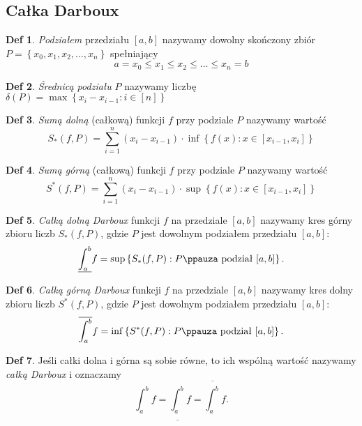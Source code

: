 \documentclass[a4paper, 12pt]{mwart}
\theoremstyle{definition}
\newtheorem{definicja}{Def}[section]
\theoremstyle{plain}
\theoremstyle{remark}
\newcommand{\upint}[2]{
	\overline{\int_{#1}^{#2}}
}
\newcommand{\loint}[2]{
	\underline{\int_{#1}^{#2}}
}
\begin{document}
\subsection{Całka Darboux}
\begin{definicja}
	\emph{Podziałem} przedziału $[a, b]$ nazywamy dowolny skończony zbiór $P = \left\{x_0, x_1, x_2, \ldots ,x_n\right\}$ spełniający
	\begin{equation}
		a = x_0 \leq x_1 \leq x_2 \leq \ldots \leq x_n = b
	\end{equation}
\end{definicja}
\begin{definicja}
	\emph{Średnicą podziału} $P$ nazywamy liczbę $\delta (P) = \max \left\{x_i - x_{i - 1} : i \in [n]\right\}$
\end{definicja}
\begin{definicja}
	\emph{Sumą dolną} (całkową) funkcji $f$ przy podziale $P$ nazywamy wartość
	\begin{equation}
		S_*(f, P) = \sum_{i = 1}^n (x_i - x_{i - 1}) \cdot \inf\left\{f(x) : x \in [x_{i - 1}, x_i]\right\}
	\end{equation}
\end{definicja}
\begin{definicja}
	\emph{Sumą górną} (całkową) funkcji $f$ przy podziale $P$ nazywamy wartość
	\begin{equation}
		S^*(f, P) = \sum_{i = 1}^n (x_i - x_{i - 1}) \cdot \sup\left\{f(x) : x \in [x_{i - 1}, x_i]\right\}
	\end{equation}
\end{definicja}
\begin{definicja}
	\emph{Całką dolną Darboux} funkcji $f$ na przedziale $[a, b]$ nazywamy kres górny zbioru liczb $S_*(f, P)$, gdzie $P$ jest dowolnym podziałem przedziału $[a, b]$:
	\begin{equation}
		\loint{a}{b} f = \sup\left\{S_*(f, P): P \text{\ppauza podział } [a, b]\right\}.
	\end{equation}
\end{definicja}
\begin{definicja}
	\emph{Całką górną Darboux} funkcji $f$ na przedziale $[a, b]$ nazywamy kres dolny zbioru liczb $S^*(f, P)$, gdzie $P$ jest dowolnym podziałem przedziału $[a, b]$:
	\begin{equation}
		\upint{a}{b} f = \inf\left\{S^*(f, P): P \text{\ppauza podział } [a, b]\right\}.
	\end{equation}
\end{definicja}
\begin{definicja}
	Jeśli całki dolna i górna są sobie równe, to ich wspólną wartość nazywamy \emph{całką Darboux} i oznaczamy
	\begin{equation}
		\int_a^b f = \loint{a}{b} f = \upint{a}{b} f.
	\end{equation}
\end{definicja}
\end{document}
